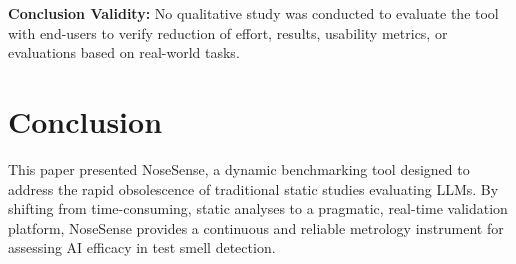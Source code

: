 \documentclass[sigconf]{acmart}
\begin{document}

\textbf{Conclusion Validity:} No qualitative study was conducted to evaluate the tool with end-users to verify reduction of effort, results, usability metrics, or evaluations based on real-world tasks.



\section{Conclusion}
\label{sec:conclusao}


This paper presented NoseSense, a dynamic benchmarking tool designed to address the rapid obsolescence of traditional static studies evaluating LLMs. By shifting from time-consuming, static analyses to a pragmatic, real-time validation platform, NoseSense provides a continuous and reliable metrology instrument for assessing AI efficacy in test smell detection.
\end{document}
